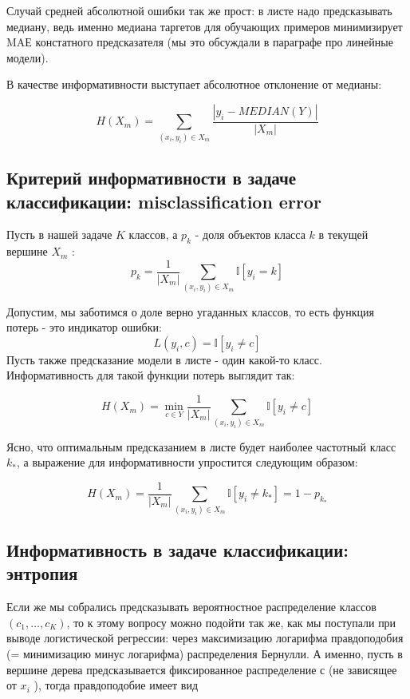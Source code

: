 Случай средней абсолютной ошибки так же прост: в листе надо предсказывать медиану, ведь именно медиана таргетов для обучающих примеров минимизирует MAЕ констатного предсказателя (мы это обсуждали в параграфе про линейные модели).

В качестве информативности выступает абсолютное отклонение от медианы:

\[
    H\left(X_{m}\right)=\sum_{\left(x_{i}, y_{i}\right) \in X_{m}} \frac{\left|y_{i}-M E D I A N(Y)\right|}{\left|X_{m}\right|}
\]

\subsection*{Критерий информативности в задаче классификации: misclassification error}
Пусть в нашей задаче \(K\) классов, а \(p_{k}\) - доля объектов класса \(k\) в текущей вершине \(X_{m}\) :
\[
    p_{k}=\frac{1}{\left|X_{m}\right|} \sum_{\left(x_{i}, y_{i}\right) \in X_{m}} \mathbb{I}\left[y_{i}=k\right]
\]

Допустим, мы заботимся о доле верно угаданных классов, то есть функция потерь - это индикатор ошибки:
\[
    L\left(y_{i}, c\right)=\mathbb{I}\left[y_{i} \neq c\right]
\]
Пусть также предсказание модели в листе - один какой-то класс. Информативность для такой функции потерь выглядит так:

\[
    H\left(X_{m}\right)=\min _{c \in Y} \frac{1}{\left|X_{m}\right|} \sum_{\left(x_{i}, y_{i}\right) \in X_{m}} \mathbb{I}\left[y_{i} \neq c\right]
\]

Ясно, что оптимальным предсказанием в листе будет наиболее частотный класс \(k_{*}\), а выражение для информативности упростится следующим образом:

\[
    H\left(X_{m}\right)=\frac{1}{\left|X_{m}\right|} \sum_{\left(x_{i}, y_{i}\right) \in X_{m}} \mathbb{I}\left[y_{i} \neq k_{*}\right]=1-p_{k_{*}}
\]

\subsection*{Информативность в задаче классификации: энтропия}
Если же мы собрались предсказывать вероятностное распределение классов \(\left(c_{1}, \ldots, c_{K}\right)\), то к этому вопросу можно подойти так же, как мы поступали при выводе логистической регрессии: через максимизацию логарифма правдоподобия (= минимизацию минус логарифма) распределения Бернулли. А именно, пусть в вершине дерева предсказывается фиксированное распределение \(с\) (не зависящее от \(x_{i}\) ), тогда правдоподобие имеет вид

